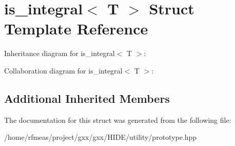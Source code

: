 \hypertarget{structis__integral}{}\section{is\+\_\+integral$<$ T $>$ Struct Template Reference}
\label{structis__integral}


Inheritance diagram for is\+\_\+integral$<$ T $>$\+:


Collaboration diagram for is\+\_\+integral$<$ T $>$\+:
\subsection*{Additional Inherited Members}


The documentation for this struct was generated from the following file\+:\begin{DoxyCompactItemize}
\item 
/home/rfmeas/project/gxx/gxx/\+H\+I\+D\+E/utility/prototype.\+hpp\end{DoxyCompactItemize}
